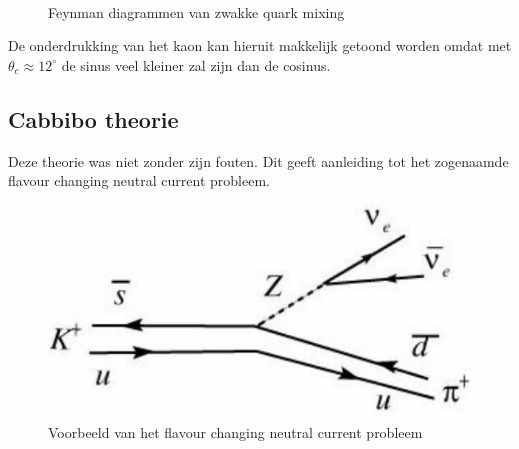 \documentclass[../main.tex]{subfiles}
\begin{document}
\begin{figure}[h]
    \centering
    \\
    \caption{Feynman diagrammen van zwakke quark mixing}
\end{figure}

De onderdrukking van het kaon kan hieruit makkelijk getoond worden omdat met $\theta_c \approx 12^\circ$ de sinus veel kleiner zal zijn dan de cosinus.

\subsection{Cabbibo theorie}%
\label{sub:cabbibo_theorie}

Deze theorie was niet zonder zijn fouten. Dit geeft aanleiding tot het zogenaamde flavour changing neutral current probleem.

\begin{figure}[h]
    \centering
    \includegraphics[width=0.5\linewidth]{meson_mixing_and_oscillations/flav_ch_problem.png}
    \caption{Voorbeeld van het flavour changing neutral current probleem}%
    \label{fig:meson_mixing_and_oscillations/flav_ch_problem}
\end{figure}
\end{document}
